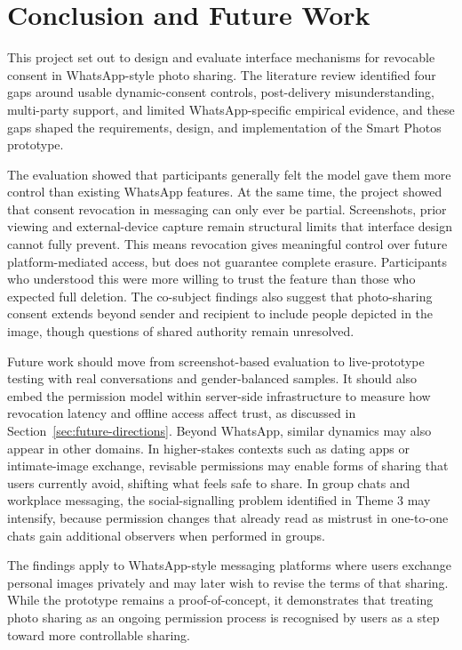 \chapter{Conclusion and Future Work}
This project set out to design and evaluate interface mechanisms for
revocable consent in WhatsApp-style photo sharing. The literature review
identified four gaps around usable dynamic-consent controls,
post-delivery misunderstanding, multi-party support, and limited
WhatsApp-specific empirical evidence, and these gaps shaped the
requirements, design, and implementation of the Smart Photos prototype.

The evaluation showed that participants generally felt the model gave them more control than existing WhatsApp features.
At the same time, the project showed that consent revocation in messaging
can only ever be partial. Screenshots, prior viewing and external-device
capture remain structural limits that interface design cannot fully
prevent. This means revocation gives meaningful control over future
platform-mediated access, but does not guarantee complete erasure.
Participants who understood this were more willing to trust the feature
than those who expected full deletion. The co-subject findings also
suggest that photo-sharing consent extends beyond sender and recipient to
include people depicted in the image, though questions of shared authority
remain unresolved.

Future work should move from screenshot-based evaluation to live-prototype testing with real conversations and gender-balanced samples. It should also embed the permission model within server-side infrastructure to measure how revocation latency and offline access affect trust, as discussed in Section~\ref{sec:future-directions}.
Beyond WhatsApp, similar dynamics may also appear in other domains. In higher-stakes contexts such as dating apps or intimate-image exchange, revisable permissions may enable forms of sharing that users currently avoid, shifting what feels safe to share. In group chats and workplace messaging, the social-signalling problem identified in Theme 3 may intensify, because permission changes that already read as mistrust in one-to-one chats gain additional observers when performed in groups.

The findings apply to WhatsApp-style messaging platforms where users exchange personal images privately and may later wish to revise the terms of that
sharing. While the prototype remains a proof-of-concept, it demonstrates that treating photo sharing as an ongoing permission process is recognised by users as a step toward more controllable sharing.